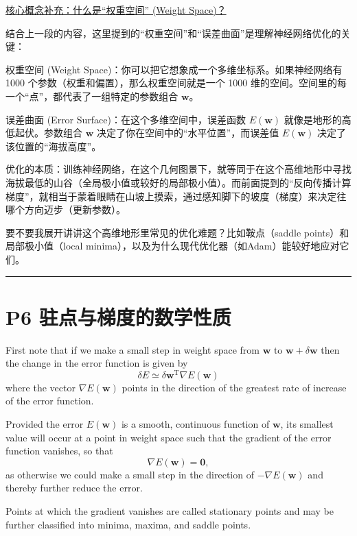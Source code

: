 \documentclass{article}
\begin{document}
{\color{blue}
\underline{核心概念补充：什么是“权重空间” (Weight Space)？}

结合上一段的内容，这里提到的“权重空间”和“误差曲面”是理解神经网络优化的关键：

权重空间 (Weight Space)：你可以把它想象成一个多维坐标系。如果神经网络有 1000 个参数（权重和偏置），那么权重空间就是一个 1000 维的空间。空间里的每一个“点”，都代表了一组特定的参数组合 $\mathbf{w}$。

误差曲面 (Error Surface)：在这个多维空间中，误差函数 $E(\mathbf{w})$ 就像是地形的高低起伏。参数组合 $\mathbf{w}$ 决定了你在空间中的“水平位置”，而误差值 $E(\mathbf{w})$ 决定了该位置的“海拔高度”。

优化的本质：训练神经网络，在这个几何图景下，就等同于在这个高维地形中寻找海拔最低的山谷（全局极小值或较好的局部极小值）。而前面提到的“反向传播计算梯度”，就相当于蒙着眼睛在山坡上摸索，通过感知脚下的坡度（梯度）来决定往哪个方向迈步（更新参数）。

要不要我展开讲讲这个高维地形里常见的优化难题？比如鞍点（saddle points）和局部极小值（local minima），以及为什么现代优化器（如Adam）能较好地应对它们。
}

\noindent\rule{\linewidth}{0.4pt}
 
\section{P6 驻点与梯度的数学性质}

First note that if we make a small step in weight space from $\mathbf{w}$ to $\mathbf{w} + \delta\mathbf{w}$ then the change in the error function is given by
\begin{equation}
\delta E \simeq \delta\mathbf{w}^\mathrm{T} \nabla E(\mathbf{w})
\tag{7.1}
\end{equation}
where the vector $\nabla E(\mathbf{w})$ points in the direction of the greatest rate of increase of the error function. 

Provided the error $E(\mathbf{w})$ is a smooth, continuous function of $\mathbf{w}$, its smallest value will occur at a point in weight space such that the gradient of the error function vanishes, so that
\begin{equation}
\nabla E(\mathbf{w}) = \mathbf{0},
\tag{7.2}
\end{equation}
as otherwise we could make a small step in the direction of $-\nabla E(\mathbf{w})$ and thereby further reduce the error. 

Points at which the gradient vanishes are called stationary points and may be further classified into minima, maxima, and saddle points.
\end{document}
